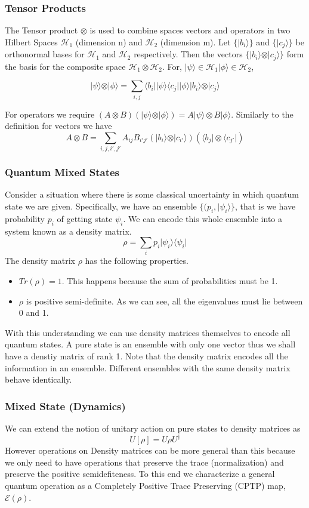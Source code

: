 \documentclass{beamer}
\newcommand{\bra}[1]{\langle #1 \vert}
\newcommand{\ket}[1]{\vert #1 \rangle}
\begin{document}
\begin{frame}
  \frametitle{Tensor Products}
  The Tensor product $\otimes$ is used to combine spaces vectors and operators in two Hilbert Spaces $\mathcal{H}_1$ (dimension n) and $\mathcal{H}_2$ (dimension m). Let $\{\ket{b_i}\}$ and $\{\ket{c_j}\}$ be orthonormal bases for $\mathcal{H}_1$ and $\mathcal{H}_2$ respectively. Then the vectors $\{\ket{b_i}\otimes\ket{c_j}\}$ form the basis for the composite space $\mathcal{H}_1 \otimes \mathcal{H}_2$. For, $\ket{\psi}\in \mathcal{H}_1 \ket{\phi} \in \mathcal{H}_2$,

$$
\ket{\psi}\otimes\ket{\phi} = \sum\limits_{i,j}\bra{b_i}\ket{\psi}\bra{c_j}\ket{\phi}\ket{b_i}\otimes\ket{c_j}
$$

For operators we require $(A \otimes B)(\ket{\psi}\otimes\ket{\phi})=A\ket{\psi}\otimes B\ket{\phi}$. Similarly to the definition for vectors we have
$$
A \otimes B = \sum\limits_{i,j,i',j'} A_{ij}B_{i'j'}(\ket{b_i}\otimes\ket{c_{i'}})(\bra{b_j}\otimes\bra{c_{j'}})
$$
\end{frame}

\begin{frame}
  \frametitle{Quantum Mixed States}
  Consider a situation where there is some classical uncertainty in which quantum state we are given. Specifically, we have an ensemble $\{(p_i,\ket{\psi_i}\}$, that is we have probability $p_i$ of getting state $\psi_i$. We can encode this whole ensemble into a system known as a density matrix.
\[
  \rho = \sum_i p_i \ket{\psi_i}\bra{\psi_i}
\]
The density matrix $\rho$ has the following properties.
\begin{itemize}
\item $Tr(\rho) = 1$. This happens because the sum of probabilities must be 1.
\item $\rho$ is positive semi-definite. As we can see, all the eigenvalues must lie between 0 and 1.
\end{itemize}
With this understanding we can use density matrices themselves to encode all quantum states. A pure state is an ensemble with only one vector thus we shall have a denstiy matrix of rank 1. Note that the density matrix encodes all the information in an ensemble. Different ensembles with the same density matrix behave identically.
\end{frame}

\begin{frame}
  \frametitle{Mixed State (Dynamics)}
  We can extend the notion of unitary action on pure states to density matrices as
  \[
    U[\rho] = U\rho U^{\dagger}
  \]
  However operations on Density matrices can be more general than this because we only need to have operations that preserve the trace (normalization) and preserve the positive semidefiteness. To this end we characterize a general quantum operation as a Completely Positive Trace Preserving (CPTP) map, $\mathcal{E}(\rho)$.
\end{frame}
\end{document}
